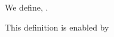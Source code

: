 \begin{definition}
  We define, \mprobdef.%
\end{definition}

\begin{justification}
  This definition is enabled by %
\end{justification}
